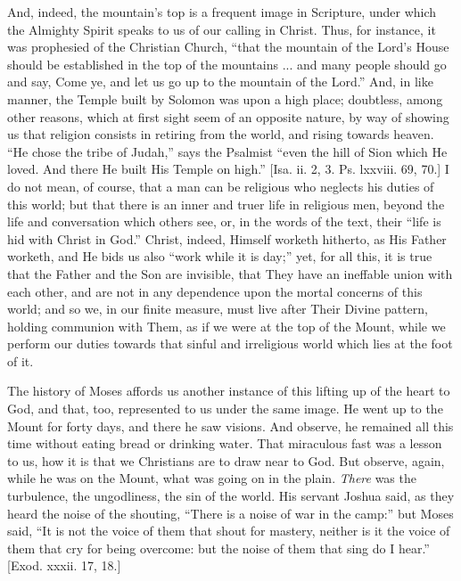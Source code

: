 And, indeed, the mountain's top is a frequent image in Scripture,
under which the Almighty Spirit speaks to us of our calling in Christ.
Thus, for instance, it was prophesied of the Christian Church,
``that the mountain of the Lord's House should be established in
the top of the mountains ... and many people should go and say, Come
ye, and let us go up to the mountain of the Lord.'' And, in like
manner, the Temple built by Solomon was upon a high place; doubtless,
among other reasons, which at first sight seem of an opposite nature,
by way of showing us that religion consists in retiring from the
world, and rising towards heaven. ``He chose the tribe of
Judah,'' says the Psalmist ``even the hill of Sion which He
loved. And there He built His Temple on high.'' [Isa. ii. 2, 3.
Ps. lxxviii. 69, 70.] I do not mean, of course, that a man can be
religious who neglects his duties of this world; but that there is an
inner and truer life in religious men, beyond the life and
conversation which others see, or, in the words of the text, their
``life is hid with Christ in God.'' Christ, indeed, Himself
worketh hitherto, as His Father worketh, and He bids us also
``work while it is day;'' yet, for all this, it is true that
the Father and the Son are invisible, that They have an ineffable
union with each other, and are not in any dependence upon the mortal
concerns of this world; and so we, in our finite measure, must live
after Their Divine pattern, holding communion with Them, as if we were
at the top of the Mount, while we perform our duties towards that
sinful and irreligious world which lies at the foot of it.

The history of Moses affords us another instance of this lifting up
of the heart to God, and that, too, represented to us under the same
image. He went up to the Mount for forty days, and there he saw
visions. And observe, he remained all this time without eating bread
or drinking water. That miraculous fast was a lesson to us, how it is
that we Christians are to draw near to God. But observe, again, while
he was on the Mount, what was going on in the plain. \emph{There} was
the turbulence, the ungodliness, the sin of the world. His servant
Joshua said, as they heard the noise of the shouting, ``There is a
noise of war in the camp:'' but Moses said, ``It is not the
voice of them that shout for mastery, neither is it the voice of them
that cry for being overcome: but the noise of them that sing do I
hear.'' [Exod. xxxii. 17, 18.]

